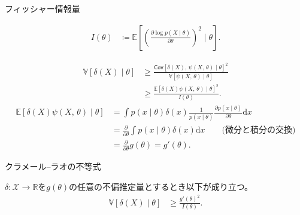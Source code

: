 \documentclass[lualatex,handout]{beamer}
\newcommand{\expt}[1]{\mathbb{E}\left[#1\right]}
\newcommand{\var}[1]{\mathbb{V}\left[#1\right]}
\newcommand{\cov}[1]{\mathsf{Cov}\left[#1\right]}
\theoremstyle{definition}
\begin{document}
\begin{frame}{フィッシャー情報量}
\small
\begin{definition}[フィッシャー情報量]
\vspace{-1em}
\begin{align*}
I(\theta) &\coloneq \expt{\left(\frac{\partial \log p(X\mid\theta)}{\partial\theta}\right)^2\mid\theta}.
\end{align*}
\end{definition}
\begin{align*}
\var{\delta(X)\mid\theta}&\ge\frac{\cov{\delta(X),\,\psi(X,\,\theta)\mid\theta}^2}{\var{\psi(X,\,\theta)\mid\theta}}\\
&\ge\frac{\expt{\delta(X)\psi(X,\,\theta)\mid\theta}^2}{I(\theta)}.
\end{align*}
\begin{align*}
\expt{\delta(X)\psi(X,\,\theta)\mid\theta}&=
\int p(x\mid\theta) \delta(x)\frac1{p(x\mid\theta)}\frac{\partial p(x\mid\theta)}{\partial\theta}\mathrm{d}x\\
&=
\frac{\partial}{\partial\theta}\int p(x\mid\theta) \delta(x)\mathrm{d}x\qquad\text{(微分と積分の交換)}\\
&=
\frac{\partial}{\partial\theta}g(\theta)=g'(\theta).
\end{align*}
\end{frame}

\begin{frame}{クラメール--ラオの不等式}
\begin{theorem}
$\delta\colon\mathcal{X}\to\mathbb{R}$を$g(\theta)$の任意の不偏推定量とするとき以下が成り立つ。
\begin{align*}
\var{\delta(X)\mid\theta} &\ge \frac{g'(\theta)^2}{I(\theta)}.
\end{align*}
\end{theorem}
\end{frame}
\end{document}
